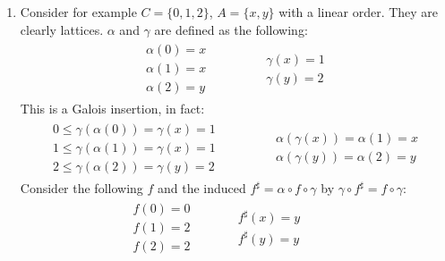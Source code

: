 \begin{exercise}
\begin{enumerate}[1.]
\begin{itemize}
        \end{itemize}
        \item Consider for example $C = \{0, 1, 2\}$, $A = \{x, y\}$ with a linear order. They are clearly lattices. $\alpha$ and $\gamma$ are defined as the following:
        \begin{gather*}
            \begin{aligned}
                \alpha(0) = x \\
                \alpha(1) = x \\
                \alpha(2) = y
            \end{aligned}
            \qquad\qquad
            \begin{aligned}
                \gamma(x) = 1 \\
                \gamma(y) = 2
            \end{aligned}
        \end{gather*}
        This is a Galois insertion, in fact:
        \begin{gather*}
            \begin{aligned}
                0 \leq \gamma(\alpha(0)) = \gamma(x) = 1 \\
                1 \leq \gamma(\alpha(1)) = \gamma(x) = 1 \\
                2 \leq \gamma(\alpha(2)) = \gamma(y) = 2
            \end{aligned}
            \qquad\qquad
            \begin{aligned}
                \alpha(\gamma(x)) = \alpha(1) = x \\
                \alpha(\gamma(y)) = \alpha(2) = y
            \end{aligned}
        \end{gather*}
        Consider the following $f$ and the induced $f^\sharp = \alpha \circ f \circ \gamma$ by $\gamma \circ f^\sharp = f \circ \gamma$:
        \begin{gather*}
            \begin{aligned}
                f(0) = 0 \\
                f(1) = 2 \\
                f(2) = 2
            \end{aligned}
            \qquad\quad
            \begin{aligned}
                f^\sharp (x) = y \\
                f^\sharp (y) = y
            \end{aligned}
            \qquad\quad

\end{gather*}
\end{enumerate}
\end{exercise}
